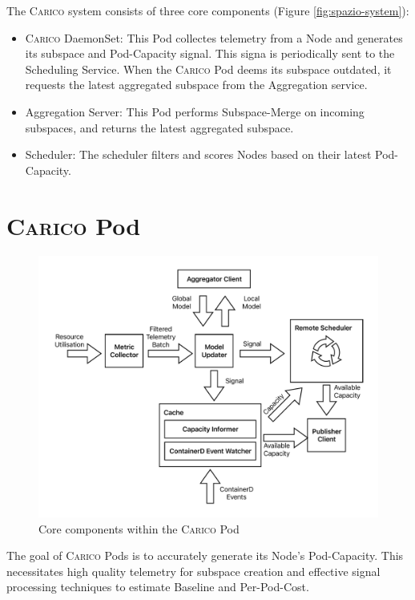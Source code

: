 The \textsc{Carico} system consists of three core components (Figure
\ref{fig:spazio-system}):
\begin{itemize}
    \item \textsc{Carico} DaemonSet: This Pod collectes telemetry from a
        Node and generates its subspace and Pod-Capacity  signal. This signa is
        periodically sent to the Scheduling Service. When the \textsc{Carico}
        Pod deems its subspace outdated, it requests the latest aggregated
        subspace from the Aggregation service.
    \item Aggregation Server: This Pod performs Subspace-Merge on incoming
        subspaces, and returns the latest aggregated subspace.
    \item Scheduler: The scheduler filters and scores Nodes based on their
        latest Pod-Capacity.
\end{itemize}

\section{\textsc{Carico} Pod}
\begin{figure}[H]
    \centering
    \includegraphics[width=\textwidth]{images/spazio-pod.pdf}
    \caption{Core components within the \textsc{Carico} Pod}
    \label{spazio-pod-components}
\end{figure}
The goal of \textsc{Carico} Pods is to accurately generate its Node's
Pod-Capacity. This necessitates high quality telemetry for subspace creation and
effective signal processing techniques to estimate Baseline and Per-Pod-Cost.

